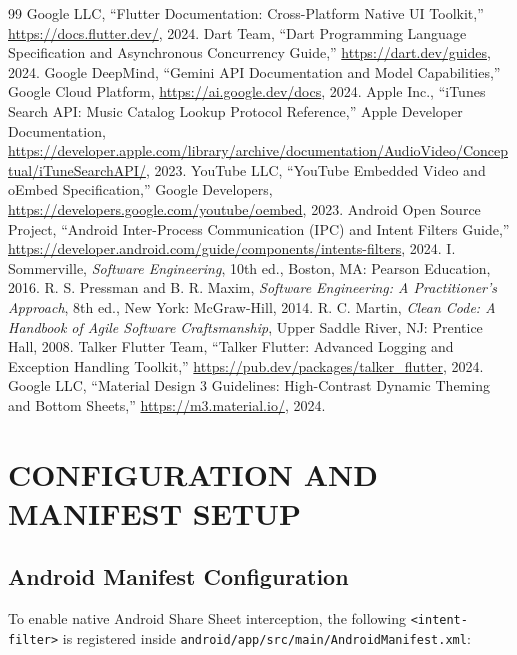 \documentclass[12pt,a4paper]{report}
\begin{document}
\clearpage
\begin{thebibliography}{99}
 Google LLC, ``Flutter Documentation: Cross-Platform Native UI Toolkit,'' \url{https://docs.flutter.dev/}, 2024.
 Dart Team, ``Dart Programming Language Specification and Asynchronous Concurrency Guide,'' \url{https://dart.dev/guides}, 2024.
 Google DeepMind, ``Gemini API Documentation and Model Capabilities,'' Google Cloud Platform, \url{https://ai.google.dev/docs}, 2024.
 Apple Inc., ``iTunes Search API: Music Catalog Lookup Protocol Reference,'' Apple Developer Documentation, \url{https://developer.apple.com/library/archive/documentation/AudioVideo/Conceptual/iTuneSearchAPI/}, 2023.
 YouTube LLC, ``YouTube Embedded Video and oEmbed Specification,'' Google Developers, \url{https://developers.google.com/youtube/oembed}, 2023.
 Android Open Source Project, ``Android Inter-Process Communication (IPC) and Intent Filters Guide,'' \url{https://developer.android.com/guide/components/intents-filters}, 2024.
 I. Sommerville, \textit{Software Engineering}, 10th ed., Boston, MA: Pearson Education, 2016.
 R. S. Pressman and B. R. Maxim, \textit{Software Engineering: A Practitioner's Approach}, 8th ed., New York: McGraw-Hill, 2014.
 R. C. Martin, \textit{Clean Code: A Handbook of Agile Software Craftsmanship}, Upper Saddle River, NJ: Prentice Hall, 2008.
 Talker Flutter Team, ``Talker Flutter: Advanced Logging and Exception Handling Toolkit,'' \url{https://pub.dev/packages/talker_flutter}, 2024.
 Google LLC, ``Material Design 3 Guidelines: High-Contrast Dynamic Theming and Bottom Sheets,'' \url{https://m3.material.io/}, 2024.
\end{thebibliography}

\clearpage
\appendix

\chapter{CONFIGURATION AND MANIFEST SETUP}
\section{Android Manifest Configuration}
To enable native Android Share Sheet interception, the following \texttt{<intent-filter>} is registered inside \texttt{android/app/src/main/AndroidManifest.xml}:
\end{document}
